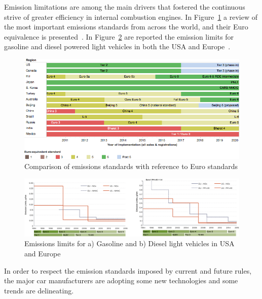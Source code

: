 Emission limitations are among the main drivers that fostered the continuous strive of greater efficiency in internal combustion engines. In Figure~\ref{fig:emission_standards} a review of the most important emissions standards from across the world, and their Euro equivalence is presented~\cite{Miller2014}. In Figure~\ref{fig:emission_levels} are reported the emission limits for gasoline and diesel powered light vehicles in both the USA and Europe~\cite{Transportpolicy.net2016}.

\begin{figure}[ht]
  \centering
  \includegraphics[width=\textwidth]{figures/review/emission_standards.png}
  \caption{Comparison of emissions standards with reference to Euro standards\label{fig:emission_standards} }
\end{figure}

\begin{figure}[ht]
  \centering
  \includegraphics[width=\textwidth]{figures/review/emissions_levels.png}
  \caption{Emissions limits for a) Gasoline and b) Diesel light vehicles in USA and Europe\label{fig:emission_levels} }
\end{figure}

In order to respect the emission standards imposed by current and future rules, the major car manufacturers are adopting some new technologies and some trends are delineating. 


